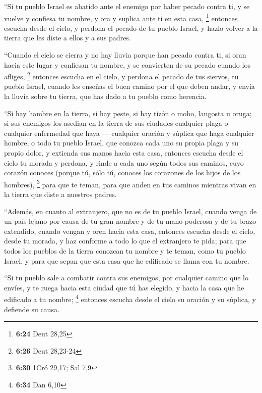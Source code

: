 \begin{paracol}{2}
 ``Si tu pueblo Israel es abatido ante el enemigo por
haber pecado contra ti, y se vuelve y confiesa tu nombre, y ora y
suplica ante ti en esta casa, \footnote{\textbf{6:24} Deut 28,25}
 entonces escucha desde el cielo, y perdona el pecado de
tu pueblo Israel, y hazlo volver a la tierra que les diste a ellos y a
sus padres.

 ``Cuando el cielo se cierra y no hay lluvia porque han
pecado contra ti, si oran hacia este lugar y confiesan tu nombre, y se
convierten de su pecado cuando los afliges, \footnote{\textbf{6:26} Deut
  28,23-24}  entonces escucha en el cielo, y perdona el
pecado de tus siervos, tu pueblo Israel, cuando les enseñas el buen
camino por el que deben andar, y envía la lluvia sobre tu tierra, que
has dado a tu pueblo como herencia.

 ``Si hay hambre en la tierra, si hay peste, si hay tizón
o moho, langosta u oruga; si sus enemigos los asedian en la tierra de
sus ciudades cualquier plaga o cualquier enfermedad que haya ---
 cualquier oración y súplica que haga cualquier hombre, o
todo tu pueblo Israel, que conozca cada uno su propia plaga y su propio
dolor, y extienda sus manos hacia esta casa,  entonces
escucha desde el cielo tu morada y perdona, y rinde a cada uno según
todos sus caminos, cuyo corazón conoces (porque tú, sólo tú, conoces los
corazones de los hijos de los hombres), \footnote{\textbf{6:30} 1Cró
  29,17; Sal 7,9}  para que te teman, para que anden en
tus caminos mientras vivan en la tierra que diste a nuestros padres.

 ``Además, en cuanto al extranjero, que no es de tu
pueblo Israel, cuando venga de un país lejano por causa de tu gran
nombre y de tu mano poderosa y de tu brazo extendido, cuando vengan y
oren hacia esta casa,  entonces escucha desde el cielo,
desde tu morada, y haz conforme a todo lo que el extranjero te pida;
para que todos los pueblos de la tierra conozcan tu nombre y te teman,
como tu pueblo Israel, y para que sepan que esta casa que he edificado
se llama con tu nombre.

 ``Si tu pueblo sale a combatir contra sus enemigos, por
cualquier camino que lo envíes, y te ruega hacia esta ciudad que tú has
elegido, y hacia la casa que he edificado a tu nombre; \footnote{\textbf{6:34}
  Dan 6,10}  entonces escucha desde el cielo su oración y
su súplica, y defiende su causa.


\end{paracol}
